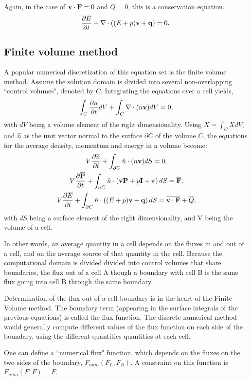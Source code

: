 Again, in the case of $\mathbf{v}\cdot\mathbf{F} = 0$ and $Q=0$, this is a conservation equation. 
\begin{gather}
    \frac{\partial E}{\partial t} + \nabla \cdot\left((E + p)\mathbf{v} +\mathbf{q}\right) =  0.~\label{eq:energy_conservation}
\end{gather}

\subsection{Finite volume method}

A popular numerical discretization of this equation set is the finite volume method. Assume the solution domain is divided into several non-overlapping ``control volumes", denoted by $C$. Integrating the equations over a cell yields,
\begin{gather}
	\int_C\frac{\partial n}{\partial t}dV + \int_C \nabla \cdot (n \mathbf{v})dV = 0,
\end{gather}
with $dV$ being a volume element of the right dimensionality. Using $\overline X = \int_C X dV$, and $\hat n$ as the unit vector normal to the surface $\partial C$ of the volume $C$, the equations for the average density, momentum and energy in a volume become:
\begin{gather}
	V\frac{\partial \overline n}{\partial t} + \int_{\partial C} \hat n \cdot (n \mathbf{v})dS = 0,\\
    	V\frac{\partial \overline {\mathbf{P}}}{\partial t} + \int_{\partial C} \hat n  \cdot\left(\mathbf{v} \mathbf{P} + p \mathbf{I} + \pi\right)dS = \overline {\mathbf{F}},\\
    	V\frac{\partial \overline E}{\partial t} +  \int_{\partial C} \hat n \cdot \left( (E + p)\mathbf{v}+\mathbf{q}\right)dS =  \overline{\mathbf{v}\cdot\mathbf{F}}+ \overline Q,
\end{gather}
with $dS$ being a surface element of the right dimensionality, and V being the volume of a cell.

In other words, an average quantity in a cell depends on the fluxes in and out of a cell, and on the average source of that quantity in the cell. Because the computational domain is divided divided into control volumes that share boundaries, the flux out of a cell A though a boundary with cell B is the same flux going into cell B through the same boundary.

Determination of the flux out of a cell boundary is in the heart of the Finite Volume method. The boundary term (appearing in the surface integrals of the previous equations) is called the flux function. The discrete numerical method would generally compute different values of the flux function on each side of the boundary, using the different quantities quantities at each cell.

One can define a ``numerical flux" function, which depends on the fluxes on the two sides of the boundary, $F_{num}(F_L, F_R)$. A constraint on this function is $F_{num}(F, F) = F$. 
























